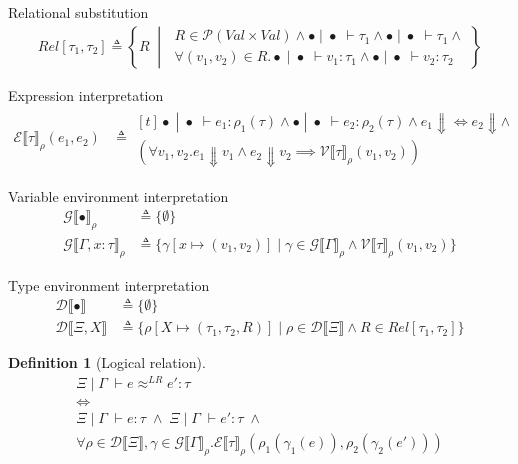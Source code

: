 \documentclass[twoside,11pt,openright]{report}
\theoremstyle{definition}
\newtheorem{definition}{Definition}[section]
\newcommand{\var}{x}
\newcommand{\expr}{e}
\newcommand{\val}{v}
\newcommand{\Tvar}{X}
\newcommand{\typ}{\tau}
\newcommand{\venv}{\Gamma}
\newcommand{\tenv}{\Xi}
\newcommand{\empvenv}{\bullet}
\newcommand{\emptenv}{\bullet}
\newcommand{\jdg}[4]{#1 \; | \; #2 \; \vdash #3 : #4}
\newcommand{\jdgType}[3]{#1 \; | \; #2 \; \vdash #3}
\newcommand{\jdgRel}[6]{#1 \; | \; #2 \; \vdash #3 \approx^{#4} #5 : #6}
\newcommand{\ValInp}[2]{\mathcal{V} \llbracket #1 \rrbracket_{#2}}
\newcommand{\ValInpGen}[2]{\ValInp{#1}{#2}(\val_1, \val_2)}
\newcommand{\ExpInp}[2]{\mathcal{E} \llbracket #1 \rrbracket_{#2}}
\newcommand{\VenvInp}[2]{\mathcal{G} \llbracket #1 \rrbracket_{#2}}
\newcommand{\TenvInp}[1]{\mathcal{D} \llbracket #1 \rrbracket}
\newcommand{\LogRel}[5]{\jdgRel{#1}{#2}{#3}{LR}{#4}{#5}}
\newcommand{\map}[2]{#1 \mapsto #2}
\begin{document}
Relational substitution
\begin{align*}
  Rel[\typ_1, \typ_2] \triangleq 
  \left\{R \; \middle\vert \;
  \begin{aligned}
    R \in \mathcal{P}(Val \times Val) \land \jdgType{\emptenv}{\empvenv}{\typ_1} \land \jdgType{\emptenv}{\empvenv}{\typ_1} \land\\ \forall (\val_1, \val_2) \in R . \jdg{\emptenv}{\empvenv}{\val_1}{\typ_1} \land \jdg{\emptenv}{\empvenv}{\val_2}{\typ_2}
  \end{aligned}
  \right\}
\end{align*}

Expression interpretation
\begin{align*}
  \ExpInp{\typ}{\rho}(\expr_1, \expr_2) &\triangleq 
  \begin{aligned}[t]
    \jdg{\emptenv}{\empvenv}{\expr_1}{\rho_1(\typ)} \land \jdg{\emptenv}{\empvenv}{\expr_2}{\rho_2(\typ)} \land \expr_1 \Downarrow \iff \expr_2 \Downarrow \land\\
    (\forall \val_1, \val_2 . \expr_1 \Downarrow \val_1 \land \expr_2 \Downarrow \val_2 \implies \ValInpGen{\typ}{\rho})
  \end{aligned}
\end{align*}

Variable environment interpretation
\begin{align*}
  \VenvInp{\empvenv}{\rho} &\triangleq \{ \emptyset \}\\
  \VenvInp{\venv, \var : \typ}{\rho} &\triangleq \{\gamma[\map{\var}{(\val_1, \val_2)}] \mid \gamma \in \VenvInp{\venv}{\rho} \land \ValInpGen{\typ}{\rho}\}
\end{align*}

Type environment interpretation
\begin{align*}
  \TenvInp{\empvenv} &\triangleq \{ \emptyset \}\\
  \TenvInp{\tenv, \Tvar} &\triangleq \{\rho[\map{\Tvar}{(\typ_1, \typ_2, R)}] \mid \rho \in \TenvInp{\tenv} \land R \in Rel[\typ_1, \typ_2]\}
\end{align*}

\begin{definition}[Logical relation]\label{def:LogRel}
  \begin{equation*}
    \begin{gathered}
      \LogRel{\tenv}{\venv}{\expr}{\expr'}{\typ}\\
      \iff\\
      \jdg{\tenv}{\venv}{\expr}{\typ} \; \land \; \jdg{\tenv}{\venv}{\expr'}{\typ} \; \land\\
      \forall \rho \in \TenvInp{\tenv}, \gamma \in \VenvInp{\venv}{\rho} . 
      \ExpInp{\typ}{\rho}(\rho_1(\gamma_1(\expr)), \rho_2(\gamma_2(\expr')))
    \end{gathered}
  \end{equation*}
\end{definition}
\end{document}
